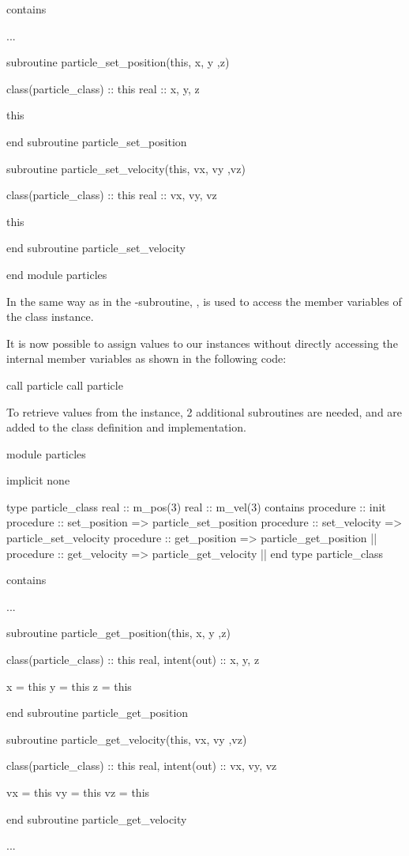 \begin{fortrancodeenv}
contains

...

subroutine particle_set_position(this, x, y ,z)

    class(particle_class) :: this
    real :: x, y, z

    this %

end subroutine particle_set_position

subroutine particle_set_velocity(this, vx, vy ,vz)

    class(particle_class) :: this
    real :: vx, vy, vz

    this %

end subroutine particle_set_velocity

end module particles        
\end{fortrancodeenv}

In the same way as in the -subroutine, , is used to access the member variables of the class instance. 

It is now possible to assign values to our instances without directly accessing the internal member variables as shown in the following code:

\begin{fortrancodeenv}
call particle %
call particle %
\end{fortrancodeenv}

To retrieve values from the instance, 2 additional subroutines are needed,  and  are added to the class definition and implementation.

\begin{fortrancodeenv}
module particles

    implicit none

    type particle_class
        real :: m_pos(3)
        real :: m_vel(3)
    contains
        procedure :: init
        procedure :: set_position => particle_set_position
        procedure :: set_velocity => particle_set_velocity
        procedure :: get_position => particle_get_position |\hladded|
        procedure :: get_velocity => particle_get_velocity |\hladded|
    end type particle_class

contains

...

subroutine particle_get_position(this, x, y ,z)

    class(particle_class) :: this
    real, intent(out) :: x, y, z

    x = this %
    y = this %
    z = this %

end subroutine particle_get_position

subroutine particle_get_velocity(this, vx, vy ,vz)

    class(particle_class) :: this
    real, intent(out) :: vx, vy, vz

    vx = this %
    vy = this %
    vz = this %

end subroutine particle_get_velocity

...
\end{fortrancodeenv}

